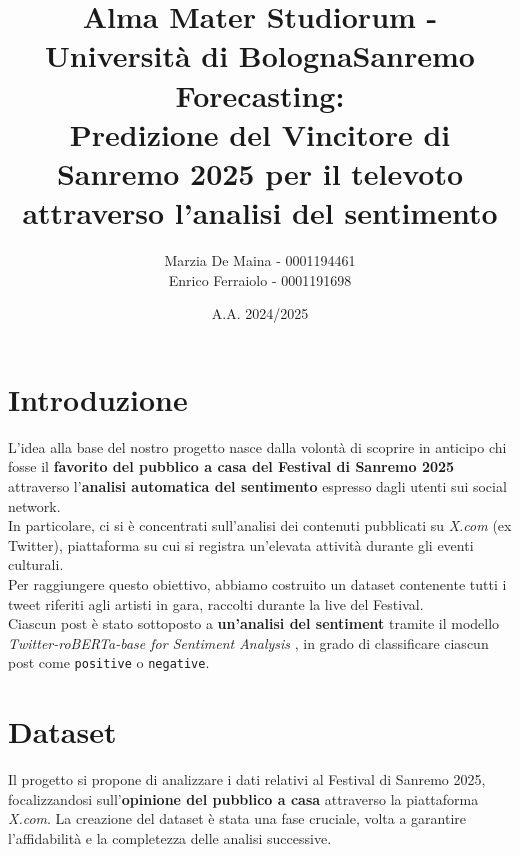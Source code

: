 \documentclass[a4paper,12pt]{article}
\title{Alma Mater Studiorum - Università di Bologna}
\author{\hfill Marzia De Maina - 0001194461\\Enrico Ferraiolo - 0001191698}
\date{A.A. 2024/2025}
\title{\textbf{Sanremo Forecasting:\\ Predizione del Vincitore di Sanremo 2025 per il televoto attraverso l'analisi del sentimento}}
\begin{document}
\maketitle
\thispagestyle{empty}

\clearpage
\thispagestyle{empty}
\hfill
\clearpage

\newpage
\setcounter{page}{1}
\tableofcontents
\clearpage
\section{Introduzione}
L'idea alla base del nostro progetto nasce dalla volontà di scoprire in  anticipo chi fosse il \textbf{favorito del pubblico a casa del Festival di Sanremo 2025} attraverso l'\textbf{analisi automatica del sentimento} espresso dagli utenti sui social network.\\In particolare, ci si è concentrati sull'analisi dei contenuti pubblicati su \textit{X.com} (ex Twitter), piattaforma su cui si registra un'elevata attività durante gli eventi culturali.\\Per raggiungere questo obiettivo, abbiamo costruito un dataset contenente tutti i tweet riferiti agli artisti in gara, raccolti durante la live del Festival.\\Ciascun post è stato sottoposto a \textbf{un'analisi del sentiment} tramite il modello \textit{Twitter-roBERTa-base for Sentiment Analysis} \cite{roberta-base-sentiment-analysis}, in grado di classificare ciascun post come \texttt{positive} o \texttt{negative}.
\newpage
\section{Dataset}
Il progetto si propone di analizzare i dati relativi al Festival di Sanremo 2025, focalizzandosi sull'\textbf{opinione del pubblico a casa} attraverso la piattaforma \textit{X.com}. La creazione del dataset è stata una fase cruciale, volta a garantire l'affidabilità e la completezza delle analisi successive.
\end{document}
